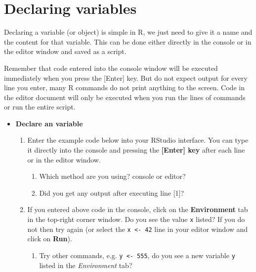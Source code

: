 \documentclass[a4paper]{book}
\providecommand{\tightlist}{%
  \setlength{\itemsep}{0pt}\setlength{\parskip}{0pt}}
\newenvironment{rmdblock}[1]
  {\vspace{1.5em}\begin{shaded*}
  \begin{itemize}
  \renewcommand{\labelitemi}{
    \raisebox{-.7\height}[0pt][0pt]{
      {\setkeys{Gin}{width=3em,keepaspectratio}\texttt{[image: images/\#1]}}
    }
  }
  \item
  }
  {
  \end{itemize}
  \end{shaded*}
  }
\newenvironment{rmdexercise}
  {\begin{rmdblock}{exercise}}
  {\end{rmdblock}}
\begin{document}
\section{Declaring variables}\label{declaring-variables}

Declaring a variable (or object) is simple in R, we just need to give it
a name and the content for that variable. This can be done either
directly in the console or in the editor window and saved as a script.

Remember that code entered into the console window will be executed
immediately when you press the {[}Enter{]} key. But do not expect output
for every line you enter, many R commands do not print anything to the
screen. Code in the editor document will only be executed when you run
the lines of commands or run the entire script.

\begin{rmdexercise}
\textbf{Declare an variable}

\begin{enumerate}
\def\labelenumi{\arabic{enumi}.}
\item
  Enter the example code below into your RStudio interface. You can type
  it directly into the console and pressing the \textbf{{[}Enter{]} key}
  after each line or in the editor window.

  \begin{enumerate}
  \def\labelenumii{\alph{enumii})}
  \tightlist
  \item
    Which method are you using? console or editor?
  \item
    Did you get any output after executing line {[}1{]}?
  \end{enumerate}
\item
  If you entered above code in the console, click on the
  \textbf{Environment} tab in the top-right corner window. Do you see
  the value \texttt{x} listed? If you do not then try again (or select
  the \texttt{x\ \textless{}-\ 42} line in your editor window and click
  on \textbf{Run}).

  \begin{enumerate}
  \def\labelenumii{\alph{enumii})}
  \tightlist
  \item
    Try other commands, e.g. \texttt{y\ \textless{}-\ 555}, do you see a
    new variable \texttt{y} listed in the \emph{Environment} tab?
  \end{enumerate}
\end{enumerate}
\end{rmdexercise}
\end{document}
